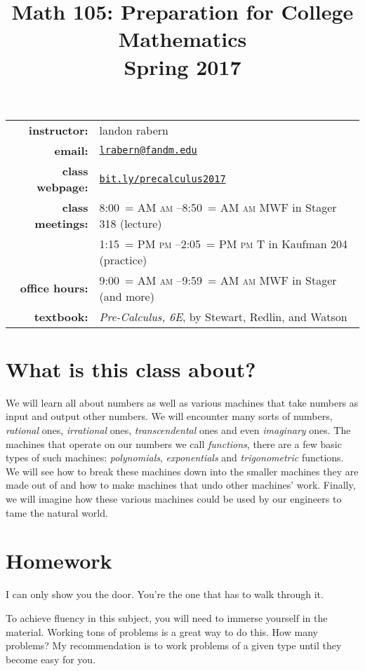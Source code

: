 \documentclass[12pt]{article}
\title{Math 105: Preparation for College Mathematics\\ \bigskip\small{Spring 2017}}
\date{}
\makeatletter
\DeclareRobustCommand{\maybefakesc}[1]{%
  \ifnum\pdfstrcmp{\f@series}{\bfdefault}=\z@
    {\fontsize{\dimexpr0.8\dimexpr\f@size pt\relax}{0}\selectfont\uppercase{#1}}%
  \else
    \textsc{#1}%
  \fi
}
\newcommand\AM{\,\maybefakesc{am}\xspace}
\newcommand\PM{\,\maybefakesc{pm}\xspace}
\makeatother
\begin{document}
\maketitle

\begin{tabular}{r l}
\textbf{instructor:}& landon rabern\\
\textbf{email:}& \href{mailto:lrabern@fandm.edu}{\nolinkurl{lrabern@fandm.edu}}\\
\textbf{class webpage:}& \href{http://bit.ly/precalculus2017}{\nolinkurl{bit.ly/precalculus2017}}\\
\textbf{class meetings:}& 8:00\AM--8:50\AM MWF in Stager 318 (lecture)\\
& 1:15\PM--2:05\PM T in Kaufman 204 (practice)\\
\textbf{office hours:}& 9:00\AM--9:59\AM MWF in Stager (and more)\\
\textbf{textbook:}& \textit{Pre-Calculus, 6E}, by Stewart, Redlin, and Watson\\
\end{tabular}

\section*{What is this class about?}
We will learn all about numbers as well as various machines that take numbers as input and output other numbers.
We will encounter many sorts of numbers, \emph{rational} ones, \emph{irrational} ones, \emph{transcendental} ones and even \emph{imaginary} ones. 
The machines that operate on our numbers we call \emph{functions}, there are a few basic types of such machines: \emph{polynomials}, \emph{exponentials} and \emph{trigonometric} functions.
We will see how to break these machines down into the smaller machines they are made out of and how to make machines that undo other machines' work.  Finally, we will 
imagine how these various machines could be used by our engineers to tame the natural world.
\section*{Homework} 
\epigraph{I can only show you the door. You're the one that has to walk through it.}{}
To achieve fluency in this subject, you will need to immerse yourself in the material.  
Working tons of problems is a great way to do this.  How many problems?  
My recommendation is to work problems of a given type until they become easy for you.
\end{document}
